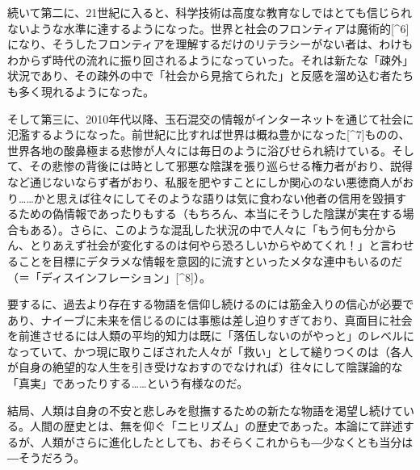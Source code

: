 \documentclass[8pt, a5paper]{ltjsarticle}
\begin{document}
続いて第二に、21世紀に入ると、科学技術は高度な教育なしではとても信じられないような水準に達するようになった。世界と社会のフロンティアは魔術的{[}\^{}6{]}になり、そうしたフロンティアを理解するだけのリテラシーがない者は、わけもわからず時代の流れに振り回されるようになっていった。それは新たな「疎外」状況であり、その疎外の中で「社会から見捨てられた」と反感を溜め込む者たちも多く現れるようになった。

そして第三に、2010年代以降、玉石混交の情報がインターネットを通じて社会に氾濫するようになった。前世紀に比すれば世界は概ね豊かになった{[}\^{}7{]}ものの、世界各地の酸鼻極まる悲惨が人々には毎日のように浴びせられ続けている。そして、その悲惨の背後には時として邪悪な陰謀を張り巡らせる権力者がおり、説得など通じないならず者がおり、私服を肥やすことにしか関心のない悪徳商人がおり\ldots\ldots かと思えば往々にしてそのような語りは気に食わない他者の信用を毀損するための偽情報であったりもする（もちろん、本当にそうした陰謀が実在する場合もある）。さらに、このような混乱した状況の中で人々に「もう何も分からん、とりあえず社会が変化するのは何やら恐ろしいからやめてくれ！」と言わせることを目標にデタラメな情報を意図的に流すといったメタな連中もいるのだ（＝「ディスインフレーション」{[}\^{}8{]}）。

要するに、過去より存在する物語を信仰し続けるのには筋金入りの信心が必要であり、ナイーブに未来を信じるのには事態は差し迫りすぎており、真面目に社会を前進させるには人類の平均的知力は既に「落伍しないのがやっと」のレベルになっていて、かつ現に取りこぼされた人々が「救い」として縋りつくのは（各人が自身の絶望的な人生を引き受けなおすのでなければ）往々にして陰謀論的な「真実」であったりする\ldots\ldots という有様なのだ。

結局、人類は自身の不安と悲しみを慰撫するための新たな物語を渇望し続けている。人間の歴史とは、無を仰ぐ「ニヒリズム」の歴史であった。本論にて詳述するが、人類がさらに進化したとしても、おそらくこれからも―少なくとも当分は―そうだろう。
\end{document}
